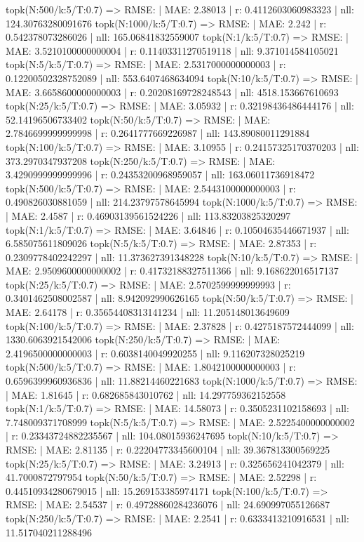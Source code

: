 topk(N:500/k:5/T:0.7) => RMSE: | MAE: 2.38013 | r: 0.4112603060983323 | nll: 124.30763280091676
topk(N:1000/k:5/T:0.7) => RMSE: | MAE: 2.242 | r: 0.542378073286026 | nll: 165.06841832559007
topk(N:1/k:5/T:0.7) => RMSE: | MAE: 3.5210100000000004 | r: 0.11403311270519118 | nll: 9.371014584105021
topk(N:5/k:5/T:0.7) => RMSE: | MAE: 2.5317000000000003 | r: 0.12200502328752089 | nll: 553.6407468634094
topk(N:10/k:5/T:0.7) => RMSE: | MAE: 3.6658600000000003 | r: 0.20208169728248543 | nll: 4518.153667610693
topk(N:25/k:5/T:0.7) => RMSE: | MAE: 3.05932 | r: 0.32198436486444176 | nll: 52.14196506733402
topk(N:50/k:5/T:0.7) => RMSE: | MAE: 2.7846699999999998 | r: 0.2641777669226987 | nll: 143.89080011291884
topk(N:100/k:5/T:0.7) => RMSE: | MAE: 3.10955 | r: 0.24157325170370203 | nll: 373.2970347937208
topk(N:250/k:5/T:0.7) => RMSE: | MAE: 3.4290999999999996 | r: 0.24353200968959057 | nll: 163.06011736918472
topk(N:500/k:5/T:0.7) => RMSE: | MAE: 2.5443100000000003 | r: 0.490826030881059 | nll: 214.23797578645994
topk(N:1000/k:5/T:0.7) => RMSE: | MAE: 2.4587 | r: 0.46903139561524226 | nll: 113.83203825320297
topk(N:1/k:5/T:0.7) => RMSE: | MAE: 3.64846 | r: 0.10504635446671937 | nll: 6.585075611809026
topk(N:5/k:5/T:0.7) => RMSE: | MAE: 2.87353 | r: 0.2309778402242297 | nll: 11.373627391348228
topk(N:10/k:5/T:0.7) => RMSE: | MAE: 2.9509600000000002 | r: 0.41732188327511366 | nll: 9.168622016517137
topk(N:25/k:5/T:0.7) => RMSE: | MAE: 2.5702599999999993 | r: 0.3401462508002587 | nll: 8.942092990626165
topk(N:50/k:5/T:0.7) => RMSE: | MAE: 2.64178 | r: 0.35654408313141234 | nll: 11.205148013649609
topk(N:100/k:5/T:0.7) => RMSE: | MAE: 2.37828 | r: 0.4275187572444099 | nll: 1330.6063921542006
topk(N:250/k:5/T:0.7) => RMSE: | MAE: 2.4196500000000003 | r: 0.6038140049920255 | nll: 9.116207328025219
topk(N:500/k:5/T:0.7) => RMSE: | MAE: 1.8042100000000003 | r: 0.6596399960936836 | nll: 11.88214460221683
topk(N:1000/k:5/T:0.7) => RMSE: | MAE: 1.81645 | r: 0.682685843010762 | nll: 14.297759362152558
topk(N:1/k:5/T:0.7) => RMSE: | MAE: 14.58073 | r: 0.3505231102158693 | nll: 7.748009371708999
topk(N:5/k:5/T:0.7) => RMSE: | MAE: 2.5225400000000002 | r: 0.23343724882235567 | nll: 104.08015936247695
topk(N:10/k:5/T:0.7) => RMSE: | MAE: 2.81135 | r: 0.22204773345600104 | nll: 39.367813300569225
topk(N:25/k:5/T:0.7) => RMSE: | MAE: 3.24913 | r: 0.325656241042379 | nll: 41.7000872797954
topk(N:50/k:5/T:0.7) => RMSE: | MAE: 2.52298 | r: 0.44510934280679015 | nll: 15.269153385974171
topk(N:100/k:5/T:0.7) => RMSE: | MAE: 2.54537 | r: 0.49728860284236076 | nll: 24.690997055126687
topk(N:250/k:5/T:0.7) => RMSE: | MAE: 2.2541 | r: 0.6333413210916531 | nll: 11.517040211288496
